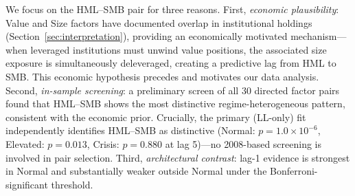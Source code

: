 \documentclass[sigconf,anonymous]{acmart}
\begin{document}
We focus on the HML--SMB pair for three reasons. First, \emph{economic
plausibility}: Value and Size factors have documented overlap in institutional
holdings (Section~\ref{sec:interpretation}), providing an economically motivated
mechanism---when leveraged institutions must unwind value positions, the associated
size exposure is simultaneously deleveraged, creating a predictive lag from HML
to SMB. This economic hypothesis precedes and motivates our data analysis.
Second, \emph{in-sample screening}: a preliminary screen of all 30 directed
factor pairs found that HML--SMB shows the most distinctive regime-heterogeneous
pattern, consistent with the economic prior. Crucially, the primary (LL-only) fit
independently identifies HML--SMB as distinctive (Normal: $p = 1.0 \times 10^{-6}$,
Elevated: $p = 0.013$, Crisis: $p = 0.880$ at lag 5)---no 2008-based screening is
involved in pair selection.
Third, \emph{architectural contrast}: lag-1 evidence is strongest in Normal and
substantially weaker outside Normal under the Bonferroni-significant threshold.
\end{document}

